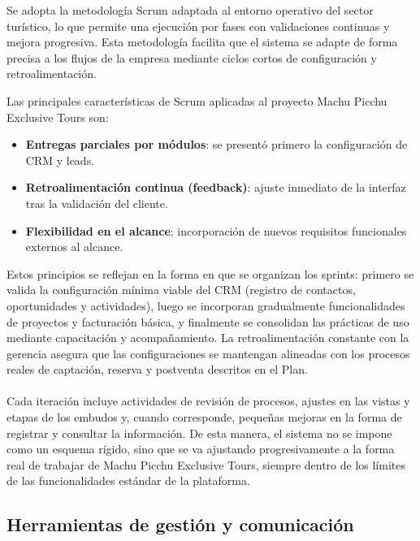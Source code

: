 \begin{indentedsubsection}
Se adopta la metodología Scrum adaptada al entorno operativo del sector turístico, lo que permite una ejecución por fases con validaciones continuas y mejora progresiva. Esta metodología facilita que el sistema se adapte de forma precisa a los flujos de la empresa mediante ciclos cortos de configuración y retroalimentación.

Las principales características de Scrum aplicadas al proyecto Machu Picchu Exclusive Tours son:

\begin{itemize}
    \item[A.] \textbf{Entregas parciales por módulos}: se presentó primero la configuración de CRM y leads.
    \item[b.] \textbf{Retroalimentación continua (feedback)}: ajuste inmediato de la interfaz tras la validación del cliente.
    \item[c.] \textbf{Flexibilidad en el alcance}: incorporación de nuevos requisitos funcionales externos al alcance.
\end{itemize}

Estos principios se reflejan en la forma en que se organizan los sprints: primero se valida la configuración mínima viable del CRM (registro de contactos, oportunidades y actividades), luego se incorporan gradualmente funcionalidades de proyectos y facturación básica, y finalmente se consolidan las prácticas de uso mediante capacitación y acompañamiento. La retroalimentación constante con la gerencia asegura que las configuraciones se mantengan alineadas con los procesos reales de captación, reserva y postventa descritos en el Plan.
\\
\\
Cada iteración incluye actividades de revisión de procesos, ajustes en las vistas y etapas de los embudos y, cuando corresponde, pequeñas mejoras en la forma de registrar y consultar la información. De esta manera, el sistema no se impone como un esquema rígido, sino que se va ajustando progresivamente a la forma real de trabajar de Machu Picchu Exclusive Tours, siempre dentro de los límites de las funcionalidades estándar de la plataforma.

\end{indentedsubsection}

\subsection{Herramientas de gestión y comunicación}

